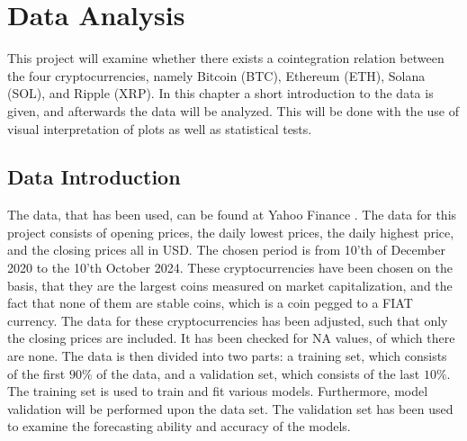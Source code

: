 \chapter{Data Analysis}\label{chap:dataanlysis}
This project will examine whether there exists a cointegration relation between the four cryptocurrencies, namely Bitcoin (BTC), Ethereum (ETH), Solana (SOL), and Ripple (XRP). In this chapter a short introduction to the data is given, and afterwards the data will be analyzed. This will be done with the use of visual interpretation of plots as well as statistical tests.

\section{Data Introduction}
The data, that has been used, can be found at Yahoo Finance \cite{Yahoo_Finance}. The data for this project consists of opening prices, the daily lowest prices, the daily highest price, and the closing prices all in USD. The chosen period is from 10'th of December 2020 to the 10'th October 2024. These cryptocurrencies have been chosen on the basis, that they are the largest coins measured on market capitalization, and the fact that none of them are stable coins, which is a coin pegged to a FIAT currency. The data for these cryptocurrencies has been adjusted, such that only the closing prices are included. It has been checked for NA values, of which there are none. The data is then divided into two parts: a training set, which consists of the first $90\%$ of the data, and a validation set, which consists of the last $10\%$. The training set is used to train and fit various models. Furthermore, model validation will be performed upon the data set. The validation set has been used to examine the forecasting ability and accuracy of the models.\\
